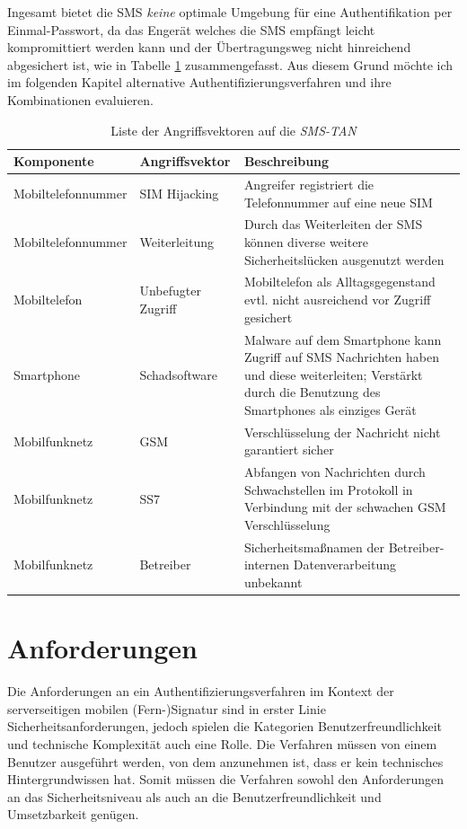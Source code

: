 \documentclass[11pt,a4paper,ngerman]{scrreprt}
\begin{document}
Ingesamt bietet die SMS \emph{keine} optimale Umgebung für eine Authentifikation per Einmal-Passwort, da das Engerät welches die SMS empfängt leicht kompromittiert werden kann und der Übertragungsweg nicht hinreichend abgesichert ist, wie in Tabelle \ref{table:AngriffsvektorenSMSTAN} zusammengefasst. Aus diesem Grund möchte ich im folgenden Kapitel alternative Authentifizierungsverfahren und ihre Kombinationen evaluieren.
\begin{table}[htbp]
    \begin{tabularx}{\textwidth}{ llX }
        \toprule
        Komponente & Angriffsvektor & Beschreibung  \\
        \midrule
        Mobiltelefonnummer & SIM Hijacking & Angreifer registriert die Telefonnummer auf eine neue SIM \\
        Mobiltelefonnummer & Weiterleitung & Durch das Weiterleiten der SMS können diverse weitere Sicherheitslücken ausgenutzt werden \\
        Mobiltelefon & Unbefugter Zugriff & Mobiltelefon als Alltagsgegenstand evtl. nicht ausreichend vor Zugriff gesichert \\
        Smartphone & Schadsoftware & Malware auf dem Smartphone kann Zugriff auf SMS Nachrichten haben und diese weiterleiten; Verstärkt durch die Benutzung des Smartphones als einziges Gerät \\
        Mobilfunknetz & GSM & Verschlüsselung der Nachricht nicht garantiert sicher \\
        Mobilfunknetz & SS7 & Abfangen von Nachrichten durch Schwachstellen im Protokoll in Verbindung mit der schwachen GSM Verschlüsselung \\
        Mobilfunknetz & Betreiber & Sicherheitsmaßnamen der Betreiber-internen Datenverarbeitung unbekannt \\
        \bottomrule
    \end{tabularx}
    \caption{Liste der Angriffsvektoren auf die \textit{SMS-TAN}}
    \label{table:AngriffsvektorenSMSTAN}
\end{table}
\clearpage

\section{Anforderungen}
Die Anforderungen an ein Authentifizierungsverfahren im Kontext der serverseitigen mobilen (Fern-)Signatur sind in erster Linie Sicherheitsanforderungen, jedoch spielen die Kategorien Benutzerfreundlichkeit und technische Komplexität auch eine Rolle. Die Verfahren müssen von einem Benutzer ausgeführt werden, von dem anzunehmen ist, dass er kein technisches Hintergrundwissen hat. Somit müssen die Verfahren sowohl den Anforderungen an das Sicherheitsniveau als auch an die Benutzerfreundlichkeit und Umsetzbarkeit genügen. 
\end{document}

